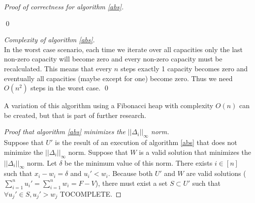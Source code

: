 \documentclass[11pt]{llncs}
\begin{document}
\begin{proof}[Proof of correctness for algorithm \ref{abs}]
\begin{itemize}
\begin{itemize}
          \end{itemize}
       \end{itemize}
       \qed
    \end{proof}
    \begin{proof}[Complexity of algorithm \ref{abs}] \ \\
       In the worst case scenario, each time we iterate over all capacities only the last non-zero capacity will become zero
       and every non-zero capacity must be recalculated. This means that every $n$ steps exactly 1 capacity becomes zero
       and eventually all capacities (maybe except for one) become zero. Thus we need $O(n^2)$ steps in the worst case. \qed
    \end{proof}
    A variation of this algorithm using a Fibonacci heap with complexity $O(n)$ can be created, but that is part of 
    further research.
    \begin{proof}[Proof that algorithm \ref{abs} minimizes the $||\Delta_i||_\infty$ norm] \ \\
       Suppose that $U'$ is the result of an execution of algorithm \ref{abs} that does not minimize the $||\Delta_i||_\infty$
       norm. Suppose that $W$ is a valid solution that minimizes the $||\Delta_i||_\infty$ norm. Let $\delta$ be the minimum
       value of this norm. There exists $i \in [n]$ such that $x_i - w_i = \delta$ and $u_i' < w_i$. Because both $U'$
       and $W$ are valid solutions ($\sum\limits_{i=1}^{n}u_i' = \sum\limits_{i=1}^{n}w_i = F - V$), there must exist a set
       $S \subset U'$ such that $\forall u_j' \in S, u_j' > w_j$ TOCOMPLETE.
    \end{proof}
\end{document}
